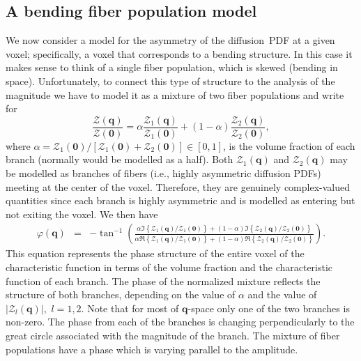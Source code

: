 \documentclass[authoryear,preprint,12pt]{elsarticle}
\newcommand{\commentSofia}[1]{\vspace{1 mm}\par
  \marginpar{\large\underline{}}\noindent
  \framebox{\begin{minipage}[c]{0.95 \textwidth}
      \color{blue}\bfseries SOFIA SAYS: #1 \end{minipage}}\vspace{2 mm}\par}
\newcommand{\q}{\mathbf{q}}
\newcommand{\cZ}{\mathcal{Z}}
\newcommand{\bld}[1]{\mathbf{#1}}
\begin{document}
\subsection{A bending fiber population model}

We now consider a model for the asymmetry of the diffusion~PDF at a
given voxel; specifically, a voxel that corresponds to a bending
structure.  In this case it makes sense to think of a single fiber
population, which is skewed (bending in space).  Unfortunately, to
connect this type of structure to the analysis of the magnitude we
have to model it as a mixture of two fiber populations and write for
\begin{equation}\label{mixture}
  \frac{\cZ(\q)}{\cZ(\bld{0})} = \alpha\frac{\cZ_1(\q)}{\cZ_1(\bld{0})}
  + (1-\alpha)\frac{\cZ_2(\q)}{\cZ_2(\bld{0})},
\end{equation}
where
$\alpha=\cZ_1(\bld{0})/[\cZ_1(\bld{0})+\cZ_2(\bld{0})]\in[0,1]$,
is the volume fraction of each branch (normally would be modelled as a
half).  
Both $\cZ_1(\q)$ and $\cZ_2(\q)$ may be modelled as branches of fibers
(i.e., highly asymmetric diffusion PDFs) meeting at the center of the
voxel. Therefore, they are genuinely complex-valued quantities since
each branch is highly asymmetric and is modelled as entering but not
exiting the voxel.  We then have
\begin{eqnarray}
  \varphi(\q) &=& -\tan^{-1}
    \left(\frac{\alpha\Im\left\{\cZ_1(\q)/\cZ_1(\bld{0})\right\} +
    (1-\alpha) \Im\left\{\cZ_2(\q)/\cZ_2(\bld{0})\right\}}
    {\alpha\Re\left\{\cZ_1(\q)/\cZ_1(\bld{0})\right\} + (1-\alpha)
    \Re\left\{\cZ_2(\q)/\cZ_2(\bld{0})\right\}}\right).
\end{eqnarray}
This equation represents the phase structure of the entire voxel of
the characteristic function in terms of the volume fraction and the
characteristic function of each branch.  The phase of the normalized
mixture reflects the structure of both branches, depending on the
value of $\alpha$ and the value of $|\cZ_l(\q)|,$ $l=1,2$.  Note that
for most of $\q$-space only one of the two branches is non-zero.  The
phase from each of the branches is changing perpendicularly to the
great circle associated with the magnitude of the branch.  The mixture
of fiber populations have a phase which is varying parallel to the
amplitude.
\end{document}
